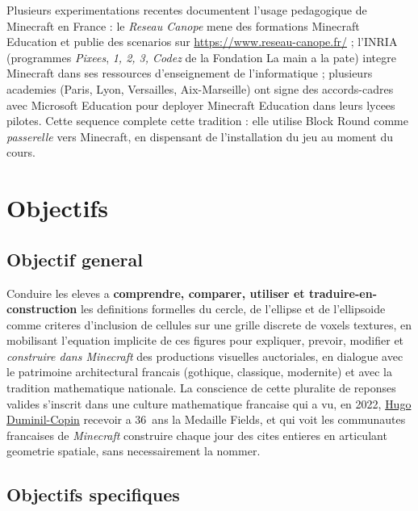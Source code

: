 \documentclass[12pt,a4paper]{scrartcl}
\newcommand{\acc}[1]{\textcolor{accent}{\textbf{#1}}}
\begin{document}
\begin{minecraft}
Plusieurs experimentations recentes documentent l'usage pedagogique de Minecraft en France : le \emph{Reseau Canope} mene des formations Minecraft Education et publie des scenarios sur \url{https://www.reseau-canope.fr/} ; l'INRIA (programmes \emph{Pixees}, \emph{1, 2, 3, Codez} de la Fondation La main a la pate) integre Minecraft dans ses ressources d'enseignement de l'informatique ; plusieurs academies (Paris, Lyon, Versailles, Aix-Marseille) ont signe des accords-cadres avec Microsoft Education pour deployer Minecraft Education dans leurs lycees pilotes. Cette sequence complete cette tradition : elle utilise Block Round comme \emph{passerelle} vers Minecraft, en dispensant de l'installation du jeu au moment du cours.
\end{minecraft}

\section{Objectifs}\label{sec:objetivos}

\subsection{Objectif general}

Conduire les eleves a \acc{comprendre, comparer, utiliser et traduire-en-construction} les definitions formelles du cercle, de l'ellipse et de l'ellipsoide comme criteres d'inclusion de cellules sur une grille discrete de voxels textures, en mobilisant l'equation implicite de ces figures pour expliquer, prevoir, modifier et \emph{construire dans Minecraft} des productions visuelles auctoriales, en dialogue avec le patrimoine architectural francais (gothique, classique, modernite) et avec la tradition mathematique nationale. La conscience de cette pluralite de reponses valides s'inscrit dans une culture mathematique francaise qui a vu, en 2022, \hyperref[sec:olympiades]{Hugo Duminil-Copin} recevoir a 36~ans la Medaille Fields, et qui voit les communautes francaises de \emph{Minecraft} construire chaque jour des cites entieres en articulant geometrie spatiale, sans necessairement la nommer.

\subsection{Objectifs specifiques}
\end{document}

